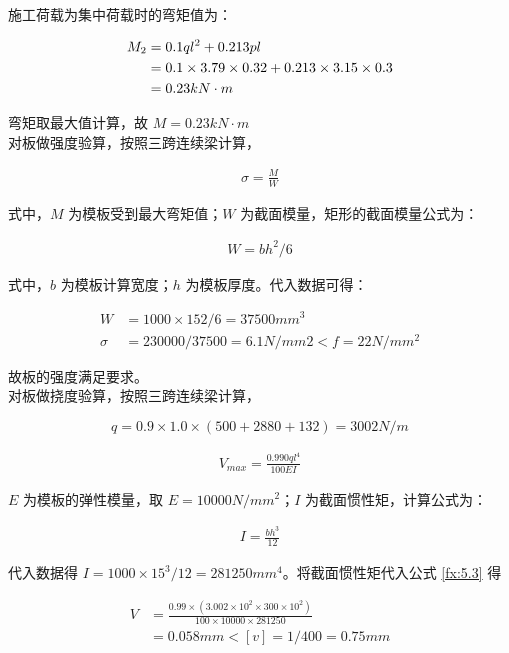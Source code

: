 施工荷载为集中荷载时的弯矩值为：

\begin{align}
    M_2&=0.1ql^2+0.213pl\\
    &=0.1\times 3.79\times 0.32+0.213\times 3.15\times 0.3 \notag\\
    &=0.23 kN \cdot m \notag
\end{align}

弯矩取最大值计算，故 $M=0.23kN\cdot m$\\

对板做强度验算，按照三跨连续梁计算，

\begin{align}
    \label{fx:5.1}
    \sigma =\frac{M}{W}
\end{align}

式中，$M$ 为模板受到最大弯矩值；$W$ 为截面模量，矩形的截面模量公式为：

\begin{align}
    \label{fx:5.2}
    W=bh^2/6
\end{align}

式中，$b$ 为模板计算宽度；$h$ 为模板厚度。代入数据可得：

\begin{align*}
    W&=1000\times 152/6=37500 mm^3\\
    \sigma &=230000/37500=6.1 N/mm2<f=22 N/mm^2
\end{align*}

故板的强度满足要求。\\

对板做挠度验算，按照三跨连续梁计算，

\[q=0.9\times 1.0\times (500+2880+132)=3002 N/m\]

\begin{align}
    \label{fx:5.3}
    V_{max}=\frac{0.990ql^4}{100EI}
\end{align}

$E$ 为模板的弹性模量，取 $E=10000 N/mm^2$；$I$ 为截面惯性矩，计算公式为：

\begin{align}
    \label{fx:5.4}
    I=\frac{bh^3}{12}
\end{align}

代入数据得 $I=1000\times 15^3/12=281250 mm^4$。将截面惯性矩代入公式 \ref{fx:5.3} 得

\begin{align*}
    V&=\frac{0.99\times (3.002\times 10^2\times 300\times 10^2)}{100\times 10000\times 281250}\\
    &=0.058 mm < [v]=1/400=0.75 mm
\end{align*}

